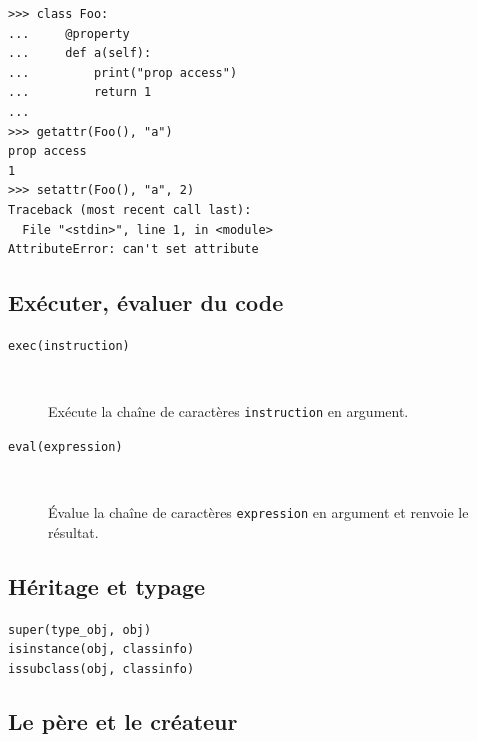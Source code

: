 \documentclass[a4paper, 10pt]{article}
\begin{document}
\begin{verbatim}
>>> class Foo:
...     @property
...     def a(self):
...         print("prop access")
...         return 1
...
>>> getattr(Foo(), "a")
prop access
1
>>> setattr(Foo(), "a", 2)
Traceback (most recent call last):
  File "<stdin>", line 1, in <module>
AttributeError: can't set attribute
\end{verbatim}


\subsection{Exécuter, évaluer du code}
\begin{description}
    \item[\texttt{exec(instruction)}]~
    
    Exécute la chaîne de caractères \texttt{instruction} en argument.
    
    \item[\texttt{eval(expression)}]~
    
    Évalue la chaîne de caractères \texttt{expression} en argument et renvoie le résultat.
\end{description}

\subsection{Héritage et typage}

\begin{description}
    \item[\texttt{super(type_obj, obj)}]
    \item[\texttt{isinstance(obj, classinfo)}]
    \item[\texttt{issubclass(obj, classinfo)}]
\end{description}

\subsection{Le père et le créateur}
\end{document}
